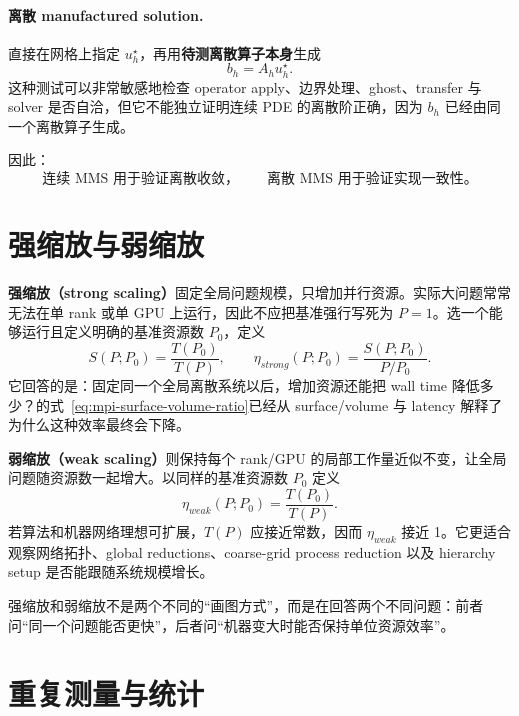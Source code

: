 \paragraph{离散 manufactured solution.}
直接在网格上指定 $u_h^\star$，再用\textbf{待测离散算子本身}生成
\begin{equation}
b_h=A_hu_h^\star.
\end{equation}
这种测试可以非常敏感地检查 operator apply、边界处理、ghost、transfer 与 solver 是否自洽，但它不能独立证明连续 PDE 的离散阶正确，因为 $b_h$ 已经由同一个离散算子生成。

因此：
\begin{equation}
\boxed{
\text{连续 MMS 用于验证离散收敛，}
\qquad
\text{离散 MMS 用于验证实现一致性。}
}
\end{equation}

\section{强缩放与弱缩放}
\label{sec:scaling}

\textbf{强缩放（strong scaling）}固定全局问题规模，只增加并行资源。实际大问题常常无法在单 rank 或单 GPU 上运行，因此不应把基准强行写死为 $P=1$。选一个能够运行且定义明确的基准资源数 $P_0$，定义
\begin{equation}
S(P;P_0)=\frac{T(P_0)}{T(P)},
\qquad
\eta_{strong}(P;P_0)=\frac{S(P;P_0)}{P/P_0}.
\label{eq:strong-scaling}
\end{equation}
它回答的是：固定同一个全局离散系统以后，增加资源还能把 wall time 降低多少？的式~\eqref{eq:mpi-surface-volume-ratio}已经从 surface/volume 与 latency 解释了为什么这种效率最终会下降。

\textbf{弱缩放（weak scaling）}则保持每个 rank/GPU 的局部工作量近似不变，让全局问题随资源数一起增大。以同样的基准资源数 $P_0$ 定义
\begin{equation}
\eta_{weak}(P;P_0)=\frac{T(P_0)}{T(P)}.
\label{eq:weak-scaling}
\end{equation}
若算法和机器网络理想可扩展，$T(P)$ 应接近常数，因而 $\eta_{weak}$ 接近 1。它更适合观察网络拓扑、global reductions、coarse-grid process reduction 以及 hierarchy setup 是否能跟随系统规模增长。

\begin{keybox}
强缩放和弱缩放不是两个不同的“画图方式”，而是在回答两个不同问题：前者问“同一个问题能否更快”，后者问“机器变大时能否保持单位资源效率”。
\end{keybox}

\section{重复测量与统计}


